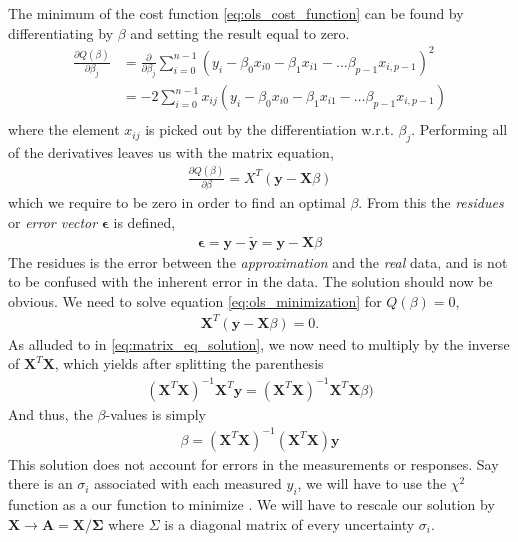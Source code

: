 \documentclass[11pt]{article}
\begin{document}
The minimum of the cost function \eqref{eq:ols_cost_function} can be found by differentiating by $\beta$ and setting the result equal to zero. 
\begin{align*}
    \frac{\partial Q(\beta)}{\partial\beta_j} &= \frac{\partial}{\partial\beta_j}\sum^{n-1}_{i=0} (y_i - \beta_0 x_{i0} - \beta_1 x_{i1} - \dots \beta_{p-1} x_{i,p-1})^2 \\
    &= -2\sum^{n-1}_{i=0} x_{ij}(y_i - \beta_0 x_{i0} - \beta_1 x_{i1} - \dots \beta_{p-1} x_{i,p-1}) \\
\end{align*}
where the element $x_{ij}$ is picked out by the differentiation w.r.t. $\beta_j$. Performing all of the derivatives leaves us with the matrix equation,
\begin{align}
    \frac{\partial Q(\beta)}{\partial\beta} = X^T (\bm{y} - \bm{X}\beta)
    \label{eq:ols_minimization}
\end{align}
which we require to be zero in order to find an optimal $\beta$. From this the \textit{residues} or \textit{error vector} $\bm{\epsilon}$ is defined,
\begin{align}
    \bm{\epsilon} = \bm{y} - \tilde{\bm{y}} = \bm{y} - \bm{X}\beta
    \label{eq:ols_residues}
\end{align}
The residues is the error between the \textit{approximation} and the \textit{real} data, and is not to be confused with the inherent error in the data. The solution should now be obvious. We need to solve equation \eqref{eq:ols_minimization} for $Q(\beta)=0$,
\begin{align*}
    \bm{X}^T (\bm{y} - \bm{X}\beta) = 0.
\end{align*}
As alluded to in \eqref{eq:matrix_eq_solution}, we now need to multiply by the inverse of $\bm{X}^T\bm{X}$, which yields after splitting the parenthesis
\begin{align*}
    \left(\bm{X}^T\bm{X}\right)^{-1}\bm{X}^T \bm{y} = \left(\bm{X}^T\bm{X}\right)^{-1}\bm{X}^T\bm{X}\beta)
\end{align*}
And thus, the $\beta$-values is simply
\begin{align}
    \beta = \left(\bm{X}^T\bm{X}\right)^{-1}\left(\bm{X}^T\bm{X}\right)\bm{y}
    \label{eq:ols_beta_solution}
\end{align}
This solution does not account for errors in the measurements or responses. Say there is an $\sigma_i$ associated with each measured $y_i$, we will have to use the $\chi^2$ function as a our function to minimize \citep[see notes on regression]{morten-regression}. We will have to rescale our solution by $\bm{X} \rightarrow \bm{A}=\bm{X}/\bm{\Sigma}$ where $\Sigma$ is a diagonal matrix of every uncertainty $\sigma_i$.
\end{document}
